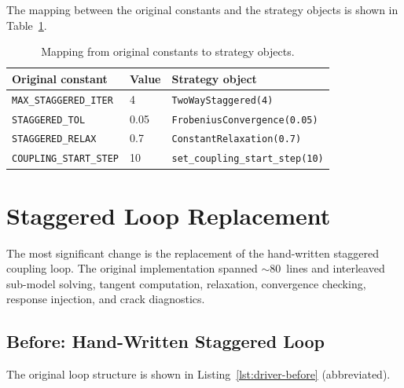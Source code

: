 The mapping between the original constants and the strategy objects is
shown in Table~\ref{tab:driver-mapping}.

\begin{table}[htb]
\centering
\caption{Mapping from original constants to strategy objects.}
\label{tab:driver-mapping}
\begin{tabular}{lll}
\hline
\textbf{Original constant} & \textbf{Value} & \textbf{Strategy object} \\
\hline
\texttt{MAX\_STAGGERED\_ITER}  & 4    & \texttt{TwoWayStaggered(4)} \\
\texttt{STAGGERED\_TOL}        & 0.05 & \texttt{FrobeniusConvergence(0.05)} \\
\texttt{STAGGERED\_RELAX}      & 0.7  & \texttt{ConstantRelaxation(0.7)} \\
\texttt{COUPLING\_START\_STEP} & 10   & \texttt{set\_coupling\_start\_step(10)} \\
\hline
\end{tabular}
\end{table}


\section{Staggered Loop Replacement}
\label{sec:driver-loop}

The most significant change is the replacement of the hand-written
staggered coupling loop.  The original implementation spanned
$\sim$80~lines and interleaved sub-model solving, tangent computation,
relaxation, convergence checking, response injection, and crack
diagnostics.

\subsection{Before: Hand-Written Staggered Loop}

The original loop structure is shown in
Listing~\ref{lst:driver-before} (abbreviated).


